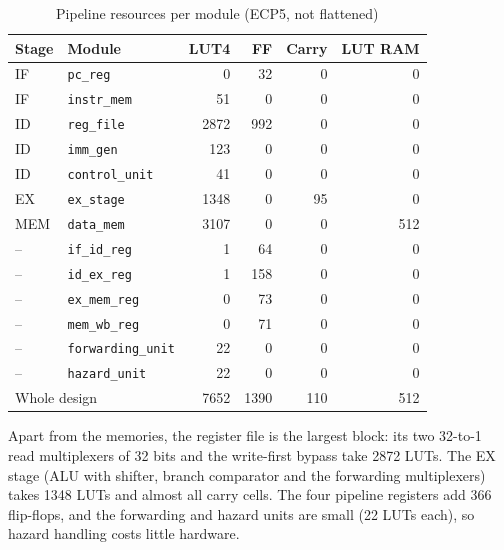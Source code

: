 \begin{table}[!t]
\centering
\caption{Pipeline resources per module (ECP5, not flattened)}
\label{tab:breakdown}
\begin{tabular}{llrrrr}
\toprule
Stage & Module & LUT4 & FF & Carry & LUT RAM \\
\midrule
IF  & \texttt{pc\_reg}          &    0 &   32 &  0 &   0 \\
IF  & \texttt{instr\_mem}       &   51 &    0 &  0 &   0 \\
ID  & \texttt{reg\_file}        & 2872 &  992 &  0 &   0 \\
ID  & \texttt{imm\_gen}         &  123 &    0 &  0 &   0 \\
ID  & \texttt{control\_unit}    &   41 &    0 &  0 &   0 \\
EX  & \texttt{ex\_stage}        & 1348 &    0 & 95 &   0 \\
MEM & \texttt{data\_mem}        & 3107 &    0 &  0 & 512 \\
--  & \texttt{if\_id\_reg}      &    1 &   64 &  0 &   0 \\
--  & \texttt{id\_ex\_reg}      &    1 &  158 &  0 &   0 \\
--  & \texttt{ex\_mem\_reg}     &    0 &   73 &  0 &   0 \\
--  & \texttt{mem\_wb\_reg}     &    0 &   71 &  0 &   0 \\
--  & \texttt{forwarding\_unit} &   22 &    0 &  0 &   0 \\
--  & \texttt{hazard\_unit}     &   22 &    0 &  0 &   0 \\
\midrule
\multicolumn{2}{l}{Whole design} & 7652 & 1390 & 110 & 512 \\
\bottomrule
\end{tabular}
\end{table}

Apart from the memories, the register file is the largest block: its two
32-to-1 read multiplexers of 32 bits and the write-first bypass take 2872 LUTs.
The EX stage (ALU with shifter, branch comparator and the forwarding
multiplexers) takes 1348 LUTs and almost all carry cells. The four pipeline
registers add 366 flip-flops, and the forwarding and hazard units are small
(22 LUTs each), so hazard handling costs little hardware.

